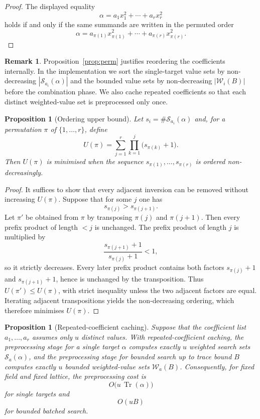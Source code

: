 \documentclass[manuscript]{acmart}
\theoremstyle{plain}
\newtheorem{proposition}[theorem]{Proposition}
\theoremstyle{definition}
\theoremstyle{nonitalicremark}
\newtheorem{remark}[theorem]{Remark}
\newcommand{\Tr}{\operatorname{Tr}}
\newcommand{\cS}{\mathcal{S}}
\newcommand{\cW}{\mathcal{W}}
\begin{document}
\begin{proof}
The displayed equality
\[
\alpha=a_1x_1^2+\cdots+a_rx_r^2
\]
holds if and only if the same summands are written in the permuted order
\[
\alpha=a_{\pi(1)}x_{\pi(1)}^2+\cdots+a_{\pi(r)}x_{\pi(r)}^2.
\]
\end{proof}

\begin{remark}\label{rem:ordering}
Proposition~\ref{prop:perm} justifies reordering the coefficients internally. In the implementation
we sort the single-target value sets by non-decreasing $|\cS_{a_i}(\alpha)|$ and the bounded value
sets by non-decreasing $|\cW_i(B)|$ before the combination phase. We also cache repeated coefficients
so that each distinct weighted-value set is preprocessed only once.
\end{remark}

\begin{proposition}[Ordering upper bound]\label{prop:ordering-upper}
Let $s_i=\#\cS_{a_i}(\alpha)$ and, for a permutation $\pi$ of $\{1,\dots,r\}$, define
\[
U(\pi)=\sum_{j=1}^r \prod_{k=1}^j \bigl(s_{\pi(k)}+1\bigr).
\]
Then $U(\pi)$ is minimised when the sequence $s_{\pi(1)},\dots,s_{\pi(r)}$ is ordered
non-decreasingly.
\end{proposition}

\begin{proof}
It suffices to show that every adjacent inversion can be removed without increasing $U(\pi)$. Suppose
that for some $j$ one has
\[
s_{\pi(j)} > s_{\pi(j+1)}.
\]
Let $\pi'$ be obtained from $\pi$ by transposing $\pi(j)$ and $\pi(j+1)$. Then every prefix product
of length $<j$ is unchanged. The prefix product of length $j$ is multiplied by
\[
\frac{s_{\pi(j+1)}+1}{s_{\pi(j)}+1}<1,
\]
so it strictly decreases. Every later prefix product contains both factors
$s_{\pi(j)}+1$ and $s_{\pi(j+1)}+1$, hence is unchanged by the transposition. Thus
$U(\pi')\le U(\pi)$, with strict inequality unless the two adjacent factors are equal. Iterating
adjacent transpositions yields the non-decreasing ordering, which therefore minimises $U(\pi)$.
\end{proof}

\begin{proposition}[Repeated-coefficient caching]\label{prop:caching}
Suppose that the coefficient list $a_1,\dots,a_r$ assumes only $u$ distinct values.
With repeated-coefficient caching, the preprocessing stage for a single target $\alpha$ computes
exactly $u$ weighted search sets $\cS_a(\alpha)$, and the preprocessing stage for bounded search up
to trace bound $B$ computes exactly $u$ bounded weighted-value sets $\cW_a(B)$.
Consequently, for fixed field and fixed lattice, the preprocessing cost is
\[
O\bigl(u\,\Tr(\alpha)\bigr)
\]
for single targets and
\[
O(uB)
\]
for bounded batched search.
\end{proposition}
\end{document}
